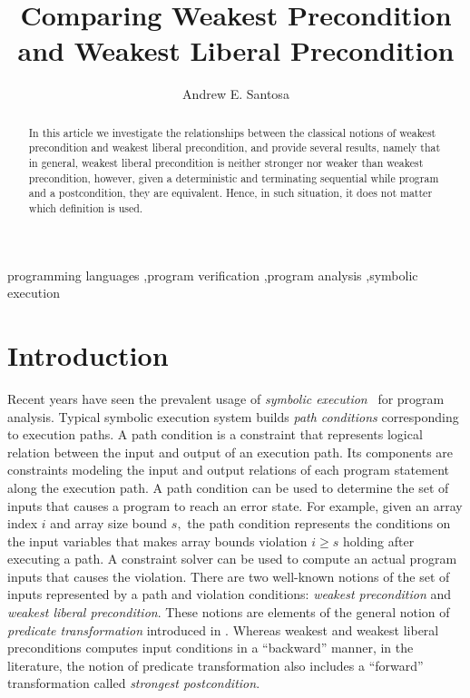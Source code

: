 \documentclass[times]{elsarticle}
\title{Comparing Weakest Precondition and Weakest Liberal Precondition}
\author{Andrew E. Santosa}
\begin{document}
\begin{abstract}
  In this article we investigate the relationships between the
classical notions of weakest precondition and weakest liberal
precondition, and provide several results, namely that in general,
weakest liberal precondition is neither stronger nor weaker than
weakest precondition, however, given a deterministic and terminating
sequential while program and a postcondition, they are equivalent.
Hence, in such situation, it does not matter which definition is used.
\end{abstract}

\begin{keyword}
programming languages \sep program verification \sep program analysis \sep symbolic execution
\end{keyword}

\maketitle

\section{Introduction}
\label{sec:intro}

Recent years have seen the prevalent usage of \emph{symbolic
  execution\/}~\cite{king76symbolic} for program analysis. Typical
symbolic execution system builds \emph{path conditions\/}
corresponding to execution paths.  A path condition is a constraint
that represents logical relation between the input and output of an
execution path.  Its components are constraints modeling the input and
output relations of each program statement along the execution path. A
path condition can be used to determine the set of inputs that causes
a program to reach an error state. For example, given an array index
$i$ and array size bound $s,$ the path condition represents the
conditions on the input variables that makes array bounds violation
$i\geq s$ holding after executing a path. A constraint solver can be
used to compute an actual program inputs that causes the
violation. There are two well-known notions of the set of inputs
represented by a path and violation conditions: \emph{weakest
  precondition\/} and \emph{weakest liberal precondition}. These
notions are elements of the general notion of \emph{predicate
  transformation\/} introduced in \cite{dijkstra75gcl}. Whereas
weakest and weakest liberal preconditions computes input conditions in
a ``backward'' manner, in the literature, the notion of predicate
transformation also includes a ``forward'' transformation called
\emph{strongest postcondition}.
\end{document}
